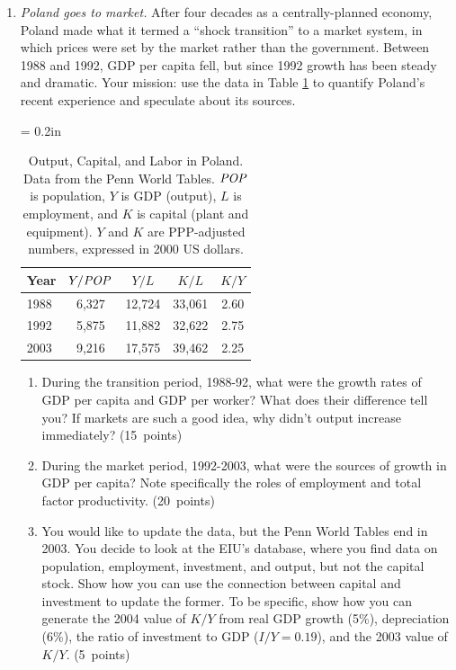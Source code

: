 \documentclass[letterpaper,12pt]{article}
\newcommand{\POP}{\mbox{\em POP\/}}
\begin{document}
\begin{enumerate}
\item {\it Poland goes to market.\/} 
After four decades as a centrally-planned economy, 
Poland made what it termed a ``shock transition'' to a market system, 
in which prices were set by the market rather than the government.  
Between 1988 and 1992, GDP per capita fell, 
but since 1992 growth has been steady and dramatic.  
Your mission:  use the data in Table \ref{tab:poland} 
to quantify Poland's recent experience 
and speculate about its sources.   

%
\begin{table}
    \centering 
    \tabcolsep = 0.2in
    \begin{tabular}{lcccc}
    \hline\hline
    Year    &  $Y/\POP $  &  $Y/L$  &  $K/L$  & $K/Y$  \\
    \hline\hline
    1988 &  6,327 &  12,724  &  33,061  &  2.60 \\
    1992 &  5,875 &  11,882  &  32,622  &  2.75 \\
    2003 &  9,216 &  17,575  &  39,462  &  2.25 \\
    \hline\hline
    \end{tabular}
    \caption{Output, Capital, and Labor in Poland.
    Data from the Penn World Tables.  
    $\POP$ is population, $Y$ is GDP (output), 
    $L$ is employment, and $K$ is capital (plant and equipment).  
    $Y$ and $K$ are PPP-adjusted numbers, expressed in 2000 US dollars.}
    \label{tab:poland}    
\end{table}
%

\begin{enumerate}

\item During the transition period, 1988-92, 
what were the growth rates of GDP per capita 
and GDP per worker?  
What does their difference tell you? 
If markets are such a good idea, 
why didn't output increase immediately?  
(15~points)

\item During the market period, 1992-2003, 
what were the sources of growth in GDP per capita?  
Note specifically the roles of employment and 
total factor productivity.  
(20~points)

\item You would like to update the data, 
but the Penn World Tables end in 2003.  
You decide to look at the EIU's database, 
where you find data on population, employment, 
investment, and output, 
but not the capital stock.
Show how you can use the connection between capital 
and investment to update the former.  
To be specific, 
show how you can generate the 2004 value of $K/Y$
from real GDP growth (5\%), depreciation (6\%), 
the ratio of investment to GDP ($I/Y = 0.19$), 
and the 2003 value of $K/Y$.    
(5~points)
\end{enumerate}



\end{enumerate}
\end{document}

